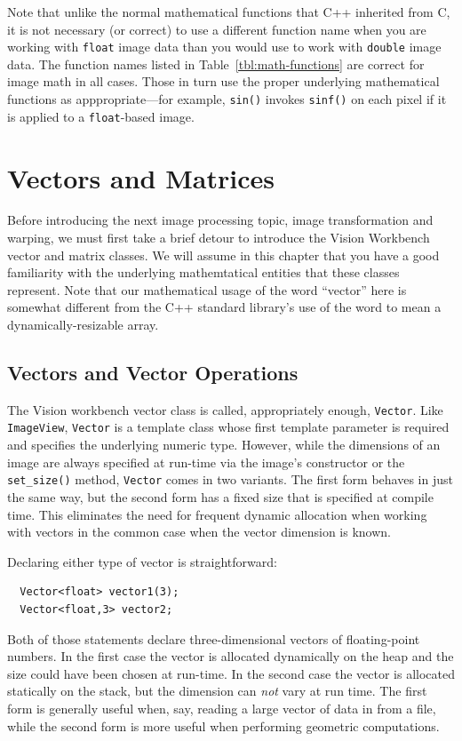 Note that unlike the normal mathematical functions that C++ inherited
from C, it is not necessary (or correct) to use a different function
name when you are working with \verb#float# image data than you would
use to work with \verb#double# image data.  The function names listed
in Table~\ref{tbl:math-functions} are correct for image math in all
cases.  Those in turn use the proper underlying mathematical functions
as apppropriate---for example, \verb#sin()# invokes \verb#sinf()# on 
each pixel if it is applied to a \verb#float#-based image.

\section{Vectors and Matrices}

Before introducing the next image processing topic, image transformation 
and warping, we must first take a brief detour to introduce the Vision 
Workbench vector and matrix classes.  We will assume in this chapter 
that you have a good familiarity with the underlying mathemtatical 
entities that these classes represent.  Note that our mathematical usage 
of the word ``vector'' here is somewhat different from the C++ standard 
library's use of the word to mean a dynamically-resizable array.

\subsection{Vectors and Vector Operations}

The Vision workbench vector class is called, appropriately enough, 
\verb#Vector#.  Like \verb#ImageView#, \verb#Vector# is a template 
class whose first template parameter is required and specifies the 
underlying numeric type.  However, while the dimensions of an image 
are always specified at run-time via the image's constructor or the 
\verb#set_size()# method, \verb#Vector# comes in two variants.  The 
first form behaves in just the same way, but the second form has a 
fixed size that is specified at compile time.  This eliminates the 
need for frequent dynamic allocation when working with vectors in 
the common case when the vector dimension is known.

Declaring either type of vector is straightforward:
\begin{verbatim}
  Vector<float> vector1(3);
  Vector<float,3> vector2;
\end{verbatim}
Both of those statements declare three-dimensional vectors of 
floating-point numbers.  In the first case the vector is allocated 
dynamically on the heap and the size could have been chosen at 
run-time.  In the second case the vector is allocated statically 
on the stack, but the dimension can {\it not} vary at run time.
The first form is generally useful when, say, reading a large 
vector of data in from a file, while the second form is more 
useful when performing geometric computations.

